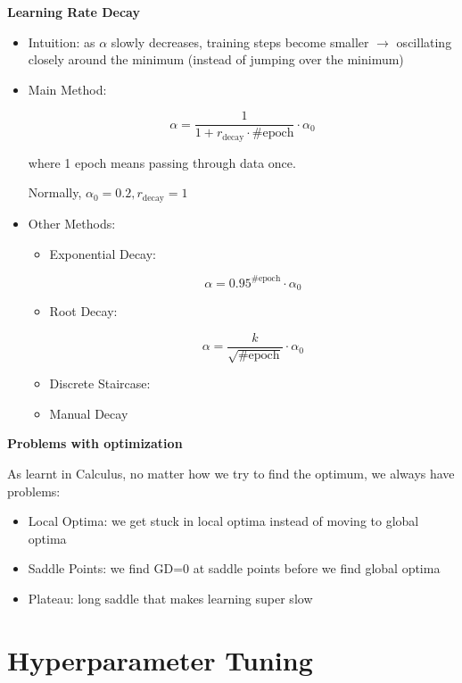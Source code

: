 \documentclass[
]{book}
\providecommand{\tightlist}{%
  \setlength{\itemsep}{0pt}\setlength{\parskip}{0pt}}
\begin{document}
\textbf{Learning Rate Decay}

\begin{itemize}
\item
  Intuition: as \(\alpha\) slowly decreases, training steps become
  smaller \(\rightarrow\) oscillating closely around the minimum
  (instead of jumping over the minimum)
\item
  Main Method:

  \[\begin{equation}
    \alpha=\frac{1}{1+r_{\text{decay}}\cdot \text{#epoch}}\cdot\alpha_0
    \end{equation}\]

  where 1 epoch means passing through data once.

  Normally, \(\alpha_0=0.2,r_{\text{decay}}=1\)
\item
  Other Methods:

  \begin{itemize}
  \item
    Exponential Decay:

    \[\begin{equation}
      \alpha=0.95^{\text{#epoch}}\cdot\alpha_0
      \end{equation}\]
  \item
    Root Decay:

    \[\begin{equation}
      \alpha=\frac{k}{\sqrt{\text{#epoch}}}\cdot\alpha_0
      \end{equation}\]
  \item
    Discrete Staircase:
  \item
    Manual Decay
  \end{itemize}
\end{itemize}

\textbf{Problems with optimization}

As learnt in Calculus, no matter how we try to find the optimum, we
always have problems:

\begin{itemize}
\tightlist
\item
  Local Optima: we get stuck in local optima instead of moving to global
  optima
\item
  Saddle Points: we find GD=0 at saddle points before we find global
  optima
\item
  Plateau: long saddle that makes learning super slow
\end{itemize}

\hypertarget{hyperparameter-tuning}{%
\section{Hyperparameter Tuning}\label{hyperparameter-tuning}}
\end{document}

